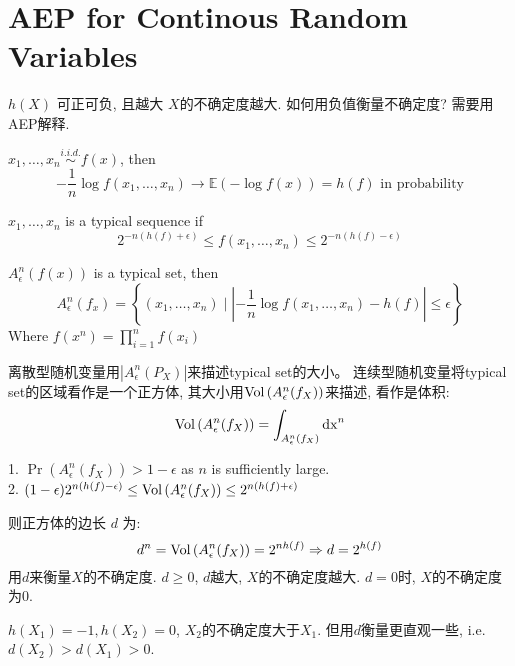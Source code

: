 \section{AEP for Continous Random Variables}
$h(X)$ 可正可负, 且越大 $X$的不确定度越大. 如何用负值衡量不确定度? 需要用AEP解释.

\begin{theorem}
$x_1,\ldots,x_n\stackrel{i.i.d.}{\sim} f(x)$, then
$$-\dfrac{1}{n}\log f(x_1,\ldots,x_n)\to \mathbb{E}\left(-\log f(x)\right)=h(f) \text{ in probability}$$
\end{theorem}

\begin{definition}
$x_1,\ldots,x_n$ is a typical sequence if
$$2^{-n(h(f)+\epsilon)}\leq f(x_1,\ldots,x_n)\leq 2^{-n(h(f)-\epsilon)}$$
\end{definition}

\begin{definition}
$A_{\epsilon}^n(f(x))$ is a typical set, then
$$A_{\epsilon}^n(f_x)=\left\{(x_1,\ldots,x_n) \mid \left|-\dfrac{1}{n}\log f(x_1,\ldots,x_n)-h(f)\right|\leq \epsilon\right\}$$
Where $f(x^n)=\prod\limits_{i=1}^n f(x_i)$
\end{definition}

离散型随机变量用$\left|A_{\epsilon}^n(P_X)\right|$来描述typical set的大小。 连续型随机变量将typical set的区域看作是一个正方体, 其大小用$\operatorname{Vol}\left(A_{\epsilon}^n(f_X)\right)$来描述, 看作是体积:
$$\operatorname{Vol}\left(A_{\epsilon}^n(f_X)\right)=\int_{A_{\epsilon}^n(f_X)}\operatorname{dx}^n$$

\begin{proposition}
1. $\Pr\left(A_{\epsilon}^n(f_X)\right) > 1-\epsilon$ as $n$ is sufficiently large. \\
2. $(1-\epsilon)2^{n\left(h(f)-\epsilon\right)} \leq \operatorname{Vol}\left(A_{\epsilon}^n(f_X)\right)\leq 2^{n\left(h(f)+\epsilon\right)}$
\end{proposition}

则正方体的边长 $d$ 为:
$$d^n = \operatorname{Vol}\left(A_{\epsilon}^n(f_X)\right) = 2^{nh(f)} \Rightarrow d=2^{h(f)}$$
用$d$来衡量$X$的不确定度. $d\geq 0$, $d$越大, $X$的不确定度越大. $d=0$时, $X$的不确定度为$0$.

$h(X_1)=-1,h(X_2)=0$, $X_2$的不确定度大于$X_1$. 但用$d$衡量更直观一些, i.e. $d(X_2)>d(X_1)>0$.